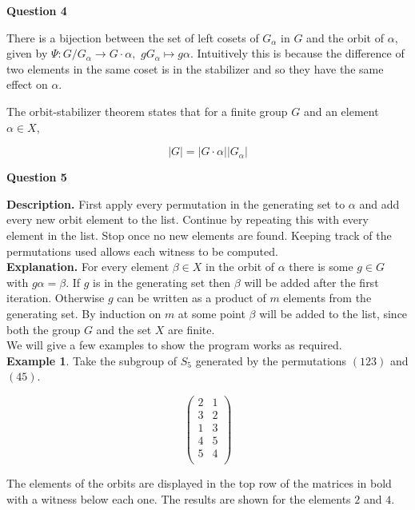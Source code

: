 \documentclass[12pt]{extarticle}
\begin{document}
\begin{center}
\textbf{Question 4}
\end{center}

There is a bijection between the set of left cosets of $G_\alpha$ in $G$ and the orbit of $\alpha$, given by $\Psi: G/G_\alpha \to G \cdot \alpha,$ $ gG_\alpha \mapsto g\alpha$. Intuitively this is because the difference of two elements in the same coset is in the stabilizer and so they have the same effect on $\alpha$.

The orbit-stabilizer theorem states that for a finite group $G$ and an element $\alpha \in X$,  

$$|G| = |G \cdot \alpha||G_\alpha|$$

\begin{center}
\textbf{Question 5}
\end{center}

\textbf{Description.} First apply every permutation in the generating set to $\alpha$ and add every new orbit element to the list. Continue by repeating this with every element in the list. Stop once no new elements are found. Keeping track of the permutations used allows each witness to be computed.\\

\textbf{Explanation.} For every element $\beta \in X$ in the orbit of $\alpha$ there is some $g \in G$ with $g\alpha = \beta$. If $g$ is in the generating set then $\beta$ will be added after the first iteration. Otherwise $g$ can be written as a product of $m$ elements from the generating set. By induction on $m$ at some point $\beta$ will be added to the list, since both the group $G$ and the set $X$ are finite.\\

  

We will give a few examples to show the program works as required.\\

\textbf{Example 1}. Take the subgroup of $S_5$ generated by the permutations $(123)$ and $(45)$.

$$\begin{pmatrix} 
  2 &  1 \\ 
  3 &  2 \\ 
  1 &  3 \\ 
  4 &  5 \\ 
  5 &  4 \\ 
\end{pmatrix} $$

The elements of the orbits are displayed in the top row of the matrices in bold with a witness below each one. The results are shown for the elements $2$ and $4$.
\end{document}
